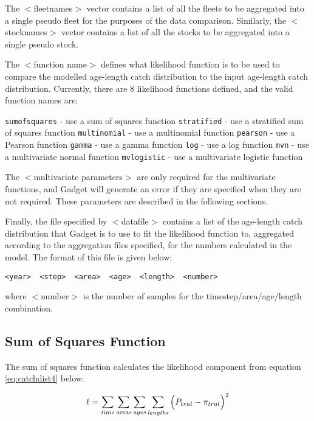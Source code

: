 \documentclass[]{book}
\begin{document}
The \(<\)fleetnames\(>\) vector contains a list of all the fleets to be
aggregated into a single pseudo fleet for the purposes of the data
comparison. Similarly, the \(<\)stocknames\(>\) vector contains a list of
all the stocks to be aggregated into a single pseudo stock.

The \(<\)function name\(>\) defines what likelihood function is to be used
to compare the modelled age-length catch distribution to the input
age-length catch distribution. Currently, there are 8 likelihood
functions defined, and the valid function names are:

\texttt{sumofsquares} - use a sum of squares function
\texttt{stratified} - use a stratified sum of squares function
\texttt{multinomial} - use a multinomial function
\texttt{pearson} - use a Pearson function
\texttt{gamma} - use a gamma function
\texttt{log} - use a log function
\texttt{mvn} - use a multivariate normal function
\texttt{mvlogistic} - use a multivariate logistic function

The \(<\)multivariate parameters\(>\) are only required for the multivariate
functions, and Gadget will generate an error if they are specified when
they are not required. These parameters are described in the following
sections.

Finally, the file specified by \(<\)datafile\(>\) contains a list of the
age-length catch distribution that Gadget is to use to fit the
likelihood function to, aggregated according to the aggregation files
specified, for the numbers calculated in the model. The format of this
file is given below:

\begin{verbatim}
<year>  <step>  <area>  <age>  <length>  <number>
\end{verbatim}

where \(<\)number\(>\) is the number of samples for the
timestep/area/age/length combination.

\hypertarget{sum-of-squares-function}{%
\subsection{Sum of Squares Function}\label{sum-of-squares-function}}

The sum of squares function calculates the likelihood component from
equation \eqref{eq:catchdist4} below:

\begin{equation}
\label{eq:catchdist4}
\ell = \sum_{\it time}\sum_{\it areas}\sum_{\it ages}\sum_{\it lengths} \Big( P_{tral} - \pi_{tral} \Big) ^2\end{equation}
\end{document}
